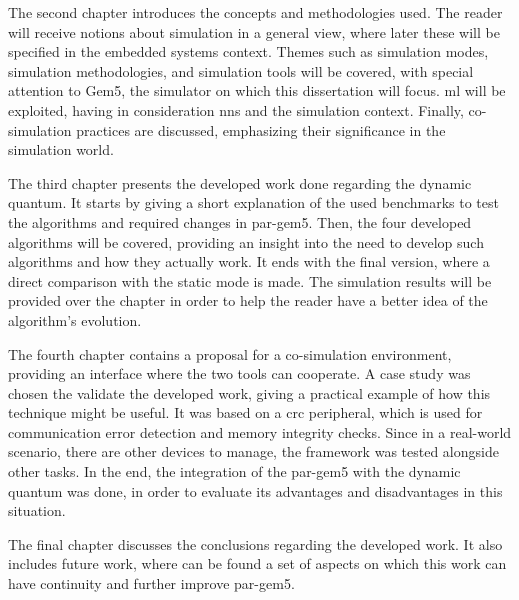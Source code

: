 The second chapter introduces the concepts and methodologies used. The reader will receive notions about simulation in a general view, where 
later these will be specified in the embedded systems context. Themes such as simulation modes, simulation methodologies, and simulation tools 
will be covered, with special attention to Gem5, the simulator on which this dissertation will focus. \gls{ml} will be exploited, having in 
consideration \glspl{nn} and the simulation context. Finally, co-simulation practices are discussed, emphasizing their significance in the 
simulation world.

The third chapter presents the developed work done regarding the dynamic quantum. It starts by giving a short explanation of the used benchmarks
to test the algorithms and required changes in par-gem5. Then, the four developed algorithms will be covered, providing an insight into the need to develop 
such algorithms and how they actually work. It ends with the final version, where a direct comparison with the static mode is made. The 
simulation results will be provided over the chapter in order to help the reader have a better idea of the algorithm's evolution.

The fourth chapter contains a proposal for a co-simulation environment, providing an interface where the two tools can cooperate. 
A case study was chosen the validate the developed work, giving a practical example of how this technique might be useful. 
It was based on a \gls{crc} peripheral, which is used for communication error detection and memory integrity checks. 
Since in a real-world scenario, there are other devices to manage, the framework was tested alongside other tasks. In the end, the integration
of the par-gem5 with the dynamic quantum was done, in order to evaluate its advantages and disadvantages in this situation. 

The final chapter discusses the conclusions regarding the developed work. It also includes future work, where can be found a set of 
aspects on which this work can have continuity and further improve par-gem5. 

